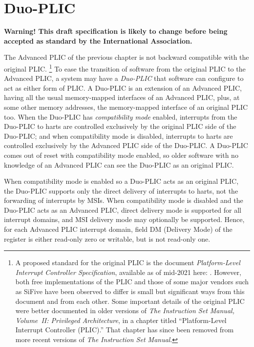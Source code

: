 
\chapter{Duo-PLIC}
\label{ch:DuoPLIC}

\textbf{%
Warning!
This draft specification is likely to change before being accepted as
standard by the {\RISCV} International Association.%
}
\bigskip

The Advanced PLIC of the previous chapter is not backward compatible
with the original {\RISCV} PLIC.%
\footnote{%
A proposed standard for the original PLIC is the document
\textit{{\RISCV} Platform-Level Interrupt Controller Specification},
available as of mid-2021 here:
.
However, both free implementations of the PLIC and those of some major
{\RISCV} vendors such as SiFive have been observed to differ is small
but significant ways from this document and from each other.
Some important details of the original PLIC were better documented in
older versions of
\textit{The {\RISCV} Instruction Set Manual, Volume~II: Privileged
Architecture}, in a chapter titled
``Platform-Level Interrupt Controller (PLIC).''
That chapter has since been removed from more recent versions of
\textit{The {\RISCV} Instruction Set Manual}.%
}
To ease the transition of software from the original PLIC to the
Advanced PLIC, a {\RISCV} system may have a \emph{\mbox{Duo-PLIC\/}}
that software can configure to act as either form of PLIC.
A \mbox{Duo-PLIC} is an extension of an Advanced PLIC, having all the
usual memory-mapped interfaces of an Advanced PLIC, plus, at some other
memory addresses, the memory-mapped interface of an original {\RISCV}
PLIC too.
When the \mbox{Duo-PLIC} has \emph{compatibility mode} enabled,
interrupts from the \mbox{Duo-PLIC} to harts are controlled exclusively
by the original PLIC side of the \mbox{Duo-PLIC};
and when compatibility mode is disabled, interrupts to harts
are controlled exclusively by the Advanced PLIC side of the
\mbox{Duo-PLIC}.
A \mbox{Duo-PLIC} comes out of reset with compatibility mode enabled,
so older software with no knowledge of an Advanced PLIC can see the
\mbox{Duo-PLIC} as an original PLIC.

When compatibility mode is enabled so a \mbox{Duo-PLIC} acts as an
original PLIC, the \mbox{Duo-PLIC} supports only the direct delivery of
interrupts to harts, not the forwarding of interrupts by MSIs.
When compatibility mode is disabled and the \mbox{Duo-PLIC} acts as
an Advanced PLIC, direct delivery mode is supported for all interrupt
domains, and MSI delivery mode may optionally be supported.
Hence, for each Advanced PLIC interrupt domain, field DM
(Delivery Mode) of the  register is either read-only zero
or writable, but is not read-only one.

